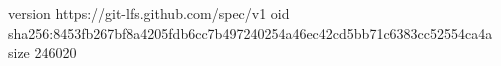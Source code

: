 version https://git-lfs.github.com/spec/v1
oid sha256:8453fb267bf8a4205fdb6cc7b497240254a46ec42cd5bb71c6383cc52554ca4a
size 246020
